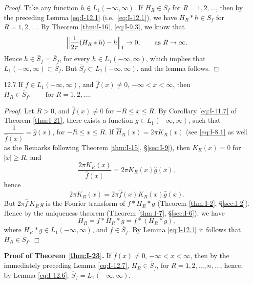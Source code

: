 \begin{proof}
Take any function $h\in L_1(-\infty,\infty)$. If $H_R\in\overline S_f$ for $R=1,2,\ldots$, then by the preceding Lemma \eqref{eq:I-12.1} (i.e.\ \eqref{eq:I-12.1}), we have $H_R*h\in\overline S_f$ for $R=1,2,\ldots$. By Theorem \ref{thm:I-16}, \eqref{eq:I-9.3}, we know that
\begin{equation*}
\Bigl\|\frac{1}{2\pi}(H_R*h)-h\Bigr\|_1\to 0,\qquad\text{as }R\to\infty.
\end{equation*}
Hence $h\in\overline S_f=\overline S_f$, for every $h\in L_1(-\infty,\infty)$, which implies that $L_1(-\infty,\infty)\subset\overline S_f$. But $\overline S_f\subset L_1(-\infty,\infty)$, and the lemma follows.
\end{proof}

\begin{nstmt}{12.7}\label{eq:I-12.7}
If $f\in L_1(-\infty,\infty)$, and $\widehat f(x)\neq 0$, $-\infty<x<\infty$, then
$H_R\in\overline S_f,\qquad\text{for }R=1,2,\ldots$.
\end{nstmt}

\begin{proof}
Let $R>0$, and $\widehat f(x)\neq 0$ for $-R\le x\le R$. By Corollary \eqref{eq:I-11.7} of Theorem \ref{thm:I-21}, there exists a function $g\in L_1(-\infty,\infty)$, such that $\dfrac{1}{\widehat f(x)}=\widehat g(x)$, for $-R\le x\le R$. If $\widehat H_R(x)=2\pi K_R(x)$ (see \eqref{eq:I-8.1} as well as the Remarks following Theorem \ref{thm:I-15}, \S\ref{sec:I-9}), then $K_R(x)=0$ for $|x|\ge R$, and
\begin{equation*}
\frac{2\pi K_R(x)}{\widehat f(x)}=2\pi K_R(x)\widehat g(x),
\end{equation*}
hence
\begin{equation*}
2\pi K_R(x)=2\pi\widehat f(x)K_R(x)\widehat g(x).
\end{equation*}
But $2\pi\widehat f\,K_R\,g$ is the Fourier transform of $f*H_R*g$ (Theorem \ref{thm:I-2}, \S\ref{sec:I-2}). Hence by the uniqueness theorem (Theorem \ref{thm:I-7}, \S\ref{sec:I-6}), we have
\begin{equation*}
H_R=f*H_R*g=f*(H_R*g),
\end{equation*}
where $H_R*g\in L_1(-\infty,\infty)$, and $f\in\overline S_f$. By Lemma \eqref{eq:I-12.1} it follows that $H_R\in\overline S_f$.
\end{proof}

\noindent\textbf{Proof of Theorem \ref{thm:I-23}.}
If $\widehat f(x)\neq 0$, $-\infty<x<\infty$, then by the immediately preceding Lemma \eqref{eq:I-12.7}, $H_R\in\overline S_f$, for $R=1,2,\ldots,n,\ldots$, hence, by Lemma \eqref{eq:I-12.6}, $\overline S_f=L_1(-\infty,\infty)$.

